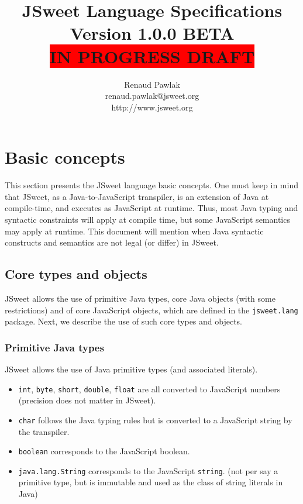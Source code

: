 \documentclass[a4paper]{report}
\begin{document}
\title{JSweet Language Specifications\\{\large Version 1.0.0 BETA\\\colorbox{red}{IN PROGRESS DRAFT}}}
\author{%
Renaud Pawlak\\
{\normalsize renaud.pawlak@jsweet.org}\\
{\normalsize http://www.jsweet.org}\\
}%
\date{}
\maketitle

\tableofcontents

\chapter{Basic concepts} 

This section presents the JSweet language basic concepts. One must keep in mind that JSweet, as a Java-to-JavaScript transpiler, is an extension of Java at compile-time, and executes as JavaScript at runtime. Thus, most Java typing and syntactic constraints will apply at compile time, but some JavaScript semantics may apply at runtime. This document will mention when Java syntactic constructs and semantics are not legal (or differ) in JSweet.

\section{Core types and objects}

JSweet allows the use of primitive Java types, core Java objects (with some restrictions) and of core JavaScript objects, which are defined in the \texttt{jsweet.lang} package. Next, we describe the use of such core types and objects.

\subsection{Primitive Java types}

JSweet allows the use of Java primitive types (and associated literals).

\begin{itemize}
\item \texttt{int}, \texttt{byte}, \texttt{short}, \texttt{double}, \texttt{float} are all converted to JavaScript numbers (precision does not matter in JSweet).
\item \texttt{char} follows the Java typing rules but is converted to a JavaScript string by the transpiler.
\item \texttt{boolean} corresponds to the JavaScript boolean.
\item \texttt{java.lang.String} corresponds to the JavaScript \texttt{string}. (not per say a primitive type, but is immutable and used as the class of string literals in Java)
\end{itemize}
\end{document}
